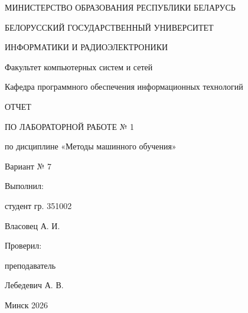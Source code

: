 \documentclass[14pt,a4paper]{extarticle}
\begin{document}
\begin{titlepage}
\thispagestyle{empty}
\begin{center}
{\fontsize{11pt}{13pt}\selectfont
МИНИСТЕРСТВО ОБРАЗОВАНИЯ РЕСПУБЛИКИ БЕЛАРУСЬ\par
БЕЛОРУССКИЙ ГОСУДАРСТВЕННЫЙ УНИВЕРСИТЕТ\par
ИНФОРМАТИКИ И РАДИОЭЛЕКТРОНИКИ\par
Факультет компьютерных систем и сетей\par
Кафедра программного обеспечения информационных технологий\par}

\vspace{4.5cm}

{\fontsize{16pt}{20pt}\selectfont
ОТЧЕТ\par
ПО ЛАБОРАТОРНОЙ РАБОТЕ № 1\par}

\vspace{0.8cm}

{\fontsize{14pt}{17pt}\selectfont
по дисциплине «Методы машинного обучения»\par\vspace{0.5cm}
Вариант № 7\par}
\end{center}

\vspace{3.2cm}

\begin{flushright}
\begin{minipage}{0.46\textwidth}
{\fontsize{13pt}{16pt}\selectfont
Выполнил:\par
студент гр. 351002\par
Власовец А. И.\par\vspace{0.6cm}
Проверил:\par
преподаватель\par
Лебедевич А. В.\par}
\end{minipage}
\end{flushright}

\vfill

\begin{center}
{\fontsize{12pt}{14pt}\selectfont
Минск 2026\par}
\end{center}
\end{titlepage}
\end{document}
